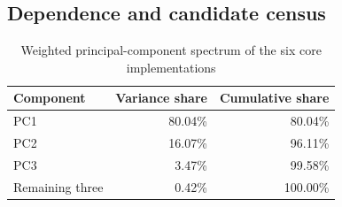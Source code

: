 \subsection{Dependence and candidate census}

\begin{table}[htbp]
\centering
\caption{Weighted principal-component spectrum of the six core implementations}\label{tab:apppca}
\small
\begin{tabular}{lrr}
\toprule
Component & Variance share & Cumulative share \\
\midrule
PC1 & 80.04\% & 80.04\% \\
PC2 & 16.07\% & 96.11\% \\
PC3 & 3.47\% & 99.58\% \\
Remaining three & 0.42\% & 100.00\% \\
\bottomrule
\end{tabular}
\end{table}

